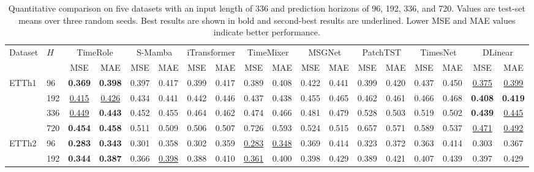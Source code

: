 \begin{table}[!t]
\begingroup
\tablecaptionfont
\caption{Quantitative comparison on five datasets with an input length of 336 and prediction horizons of 96, 192, 336, and 720. Values are test-set means over three random seeds. Best results are shown in bold and second-best results are underlined. Lower MSE and MAE values indicate better performance.}
\label{tab:main-results}
\centering
\wideresulttablefont
\setlength{\tabcolsep}{0.5pt}
\renewcommand{\arraystretch}{1.08}
\begin{tabular*}{\textwidth}{@{\extracolsep{\fill}}ll*{16}{c}@{}}
\toprule
\multirow{2}{*}{Dataset} & \multirow{2}{*}{\(H\)} & \multicolumn{2}{c}{TimeRole} & \multicolumn{2}{c}{S-Mamba} & \multicolumn{2}{c}{iTransformer} & \multicolumn{2}{c}{TimeMixer} & \multicolumn{2}{c}{MSGNet} & \multicolumn{2}{c}{PatchTST} & \multicolumn{2}{c}{TimesNet} & \multicolumn{2}{c}{DLinear} \\
\cmidrule(lr){3-4}\cmidrule(lr){5-6}\cmidrule(lr){7-8}\cmidrule(lr){9-10}\cmidrule(lr){11-12}\cmidrule(lr){13-14}\cmidrule(lr){15-16}\cmidrule(lr){17-18}
& & MSE & MAE & MSE & MAE & MSE & MAE & MSE & MAE & MSE & MAE & MSE & MAE & MSE & MAE & MSE & MAE \\
\midrule
ETTh1 & 96 & \textbf{0.369} & \textbf{0.398} & 0.397 & 0.417 & 0.399 & 0.417 & 0.389 & 0.408 & 0.422 & 0.441 & 0.399 & 0.420 & 0.437 & 0.450 & \underline{0.375} & \underline{0.399} \\
 & 192 & \underline{0.415} & \underline{0.426} & 0.434 & 0.441 & 0.442 & 0.446 & 0.437 & 0.438 & 0.455 & 0.465 & 0.462 & 0.461 & 0.466 & 0.468 & \textbf{0.408} & \textbf{0.419} \\
 & 336 & \underline{0.449} & \textbf{0.443} & 0.452 & 0.455 & 0.464 & 0.462 & 0.474 & 0.466 & 0.481 & 0.479 & 0.528 & 0.503 & 0.519 & 0.502 & \textbf{0.439} & \underline{0.445} \\
 & 720 & \textbf{0.454} & \textbf{0.458} & 0.511 & 0.509 & 0.506 & 0.507 & 0.726 & 0.593 & 0.524 & 0.515 & 0.657 & 0.571 & 0.589 & 0.537 & \underline{0.471} & \underline{0.492} \\
ETTh2 & 96 & \textbf{0.283} & \textbf{0.343} & 0.301 & 0.358 & 0.302 & 0.359 & \underline{0.283} & \underline{0.348} & 0.369 & 0.414 & 0.323 & 0.372 & 0.363 & 0.414 & 0.303 & 0.367 \\
 & 192 & \textbf{0.344} & \textbf{0.387} & 0.366 & \underline{0.398} & 0.388 & 0.410 & \underline{0.361} & 0.400 & 0.398 & 0.429 & 0.389 & 0.421 & 0.407 & 0.439 & 0.397 & 0.429 \\

\end{tabular*}
\end{table}
